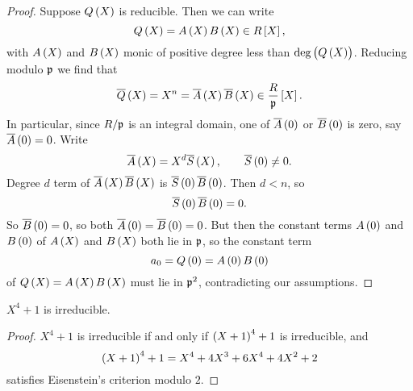 \begin{proof}
Suppose $ Q\br{X} $ is reducible. Then we can write
$$ Q\br{X} = A\br{X}B\br{X} \in R\sbr{X}, $$
with $ A\br{X} $ and $ B\br{X} $ monic of positive degree less than $ \deg\br{Q\br{X}} $. Reducing modulo $ \mathfrak{p} $ we find that
$$ \overline{Q}\br{X} = X^n = \overline{A}\br{X}\overline{B}\br{X} \in \dfrac{R}{\pp}\sbr{X}. $$
In particular, since $ R / \mathfrak{p} $ is an integral domain, one of $ \overline{A}\br{0} $ or $ \overline{B}\br{0} $ is zero, say $ \overline{A}\br{0} = 0 $. Write
$$ \overline{A}\br{X} = X^d\overline{S}\br{X}, \qquad \overline{S}\br{0} \ne 0. $$
Degree $ d $ term of $ \overline{A}\br{X}\overline{B}\br{X} $ is $ \overline{S}\br{0}\overline{B}\br{0} $. Then $ d < n $, so
$$ \overline{S}\br{0}\overline{B}\br{0} = 0. $$
So $ \overline{B}\br{0} = 0 $, so both $ \overline{A}\br{0} = \overline{B}\br{0} = 0 $. But then the constant terms $ A\br{0} $ and $ B\br{0} $ of $ A\br{X} $ and $ B\br{X} $ both lie in $ \mathfrak{p} $, so the constant term
$$ a_0 = Q\br{0} = A\br{0}B\br{0} $$
of $ Q\br{X} = A\br{X}B\br{X} $ must lie in $ \mathfrak{p}^2 $, contradicting our assumptions.
\end{proof}

\pagebreak

\begin{corollary}
$ X^4 + 1 $ is irreducible.
\end{corollary}

\begin{proof}
$ X^4 + 1 $ is irreducible if and only if $ \br{X + 1}^4 + 1 $ is irreducible, and
$$ \br{X + 1}^4 + 1 = X^4 + 4X^3 + 6X^4 + 4X^2 + 2 $$
satisfies Eisenstein's criterion modulo $ 2 $.
\end{proof}


